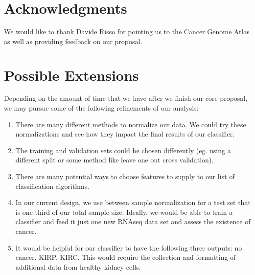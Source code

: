 \section*{Acknowledgments}
We would like to thank Davide Risso for pointing us to the Cancer Genome
Atlas as well as providing feedback on our proposal.


\section{Possible Extensions}

Depending on the amount of time that we have after we finish our core proposal, we may pursue some of the following refinements of our analysis:

\begin{enumerate}
\item There are many different methods to normalize our data. We could try these normalizations and see how they impact the final results of our classifier. 
\item The training and validation sets could be chosen differently (eg. using a different split or some method like leave one out cross validation). 
\item There are many potential ways to choose features to supply to our list of classification algorithms. 
\item In our current design, we use between sample normalization for a test set that is one-third of our total sample size. Ideally, we would be able to train a classifier and feed it just one new RNAseq data set and assess the existence of cancer. 
\item It would be helpful for our classifier to have the following three outputs: no cancer, KIRP, KIRC. This would require the collection and formatting of additional data from healthy kidney cells. 

\end{enumerate}


